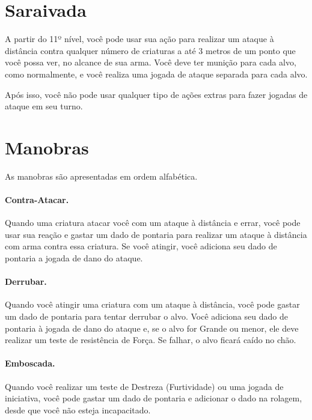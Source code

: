 \documentclass{RPG_Adventure}[2021/10/20]
\begin{document}
\begin{multicols}{2}
\section*{Saraivada}%

A partir do 11º nível, você pode usar sua ação para realizar um ataque à
distância contra qualquer número de criaturas a até 3 metros de um ponto que
você possa ver, no alcance de sua arma. Você deve ter munição para cada alvo,
como normalmente, e você realiza uma jogada de ataque separada para cada alvo.

Após isso, você não pode usar qualquer tipo de ações extras para fazer jogadas
de ataque em seu turno.

\section*{Manobras}%

As manobras são apresentadas em ordem alfabética.

\paragraph{Contra-Atacar.}%

Quando uma criatura atacar você com um ataque à distância e errar, você pode
usar sua reação e gastar um dado de pontaria para realizar um ataque à distância
com arma contra essa criatura. Se você atingir, você adiciona seu dado de
pontaria a jogada de dano do ataque.

\paragraph{Derrubar.}%

Quando você atingir uma criatura com um ataque à distância, você pode gastar um
dado de pontaria para tentar derrubar o alvo. Você adiciona seu dado de pontaria
à jogada de dano do ataque e, se o alvo for Grande ou menor, ele deve realizar
um teste de resistência de Força. Se falhar, o alvo ficará caído no chão.

\paragraph{Emboscada.}%

Quando você realizar um teste de Destreza (Furtividade) ou uma jogada de
iniciativa, você pode gastar um dado de pontaria e adicionar o dado na rolagem,
desde que você não esteja incapacitado.


\end{multicols}
\end{document}
